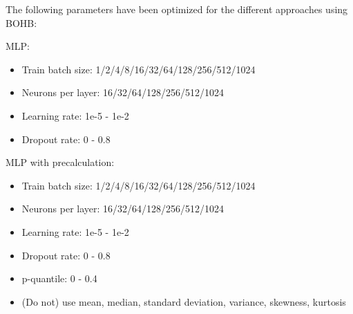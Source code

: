 \documentclass{article}
\begin{document}
The following parameters have been optimized for the different approaches using BOHB: 

MLP:
\begin{itemize}
\item Train batch size: 1/2/4/8/16/32/64/128/256/512/1024
\item Neurons per layer: 16/32/64/128/256/512/1024
\item Learning rate: 1e-5 - 1e-2
\item Dropout rate: 0 - 0.8
\end{itemize}

MLP with precalculation:
%
\begin{itemize}
\item Train batch size: 1/2/4/8/16/32/64/128/256/512/1024
\item Neurons per layer: 16/32/64/128/256/512/1024
\item Learning rate: 1e-5 - 1e-2
\item Dropout rate: 0 - 0.8
\item p-quantile: 0 - 0.4
\item (Do not) use mean, median, standard deviation, variance, skewness, kurtosis
\end{itemize}
%


\end{document}
